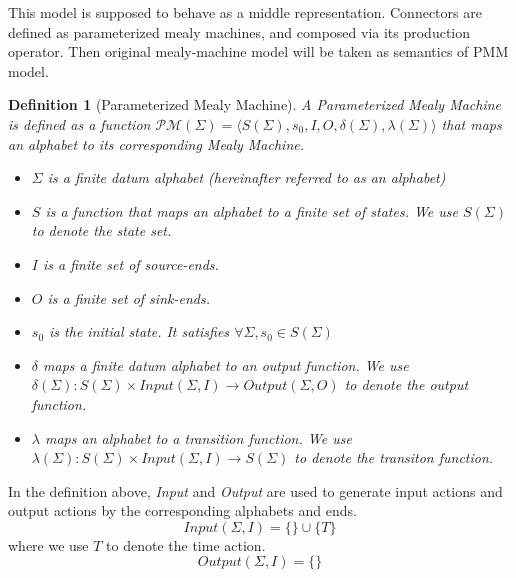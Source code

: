 \documentclass[conference, a4paper]{IEEEtran}
\newtheorem{definition}{Definition}
\begin{document}
This model is supposed to behave as a middle representation. Connectors are defined as parameterized
mealy machines, and composed via its production operator. Then original mealy-machine model will be
taken as semantics of PMM model.

\begin{definition}[Parameterized Mealy Machine]
  A \emph{Parameterized Mealy Machine} is defined as a function $\mathcal{PM}(\Sigma)=\langle
  S(\Sigma), s_0, I, O, \delta(\Sigma), \lambda(\Sigma)\rangle$ that maps an
  alphabet to its corresponding Mealy Machine. 
  \begin{itemize}
    \item[-] $\Sigma$ is a \emph{finite} datum alphabet (hereinafter referred to as an alphabet)
    \item[-] $S$ is a function that maps an alphabet to a \emph{finite} set of
      states. We use $S(\Sigma)$ to denote the state set.
    \item[-] $I$ is a finite set of source-ends.
    \item[-] $O$ is a finite set of sink-ends.
    \item[-] $s_0$ is the initial state. It satisfies $\forall \Sigma,s_0\in S(\Sigma)$
    \item[-] $\delta$ maps a \emph{finite} datum alphabet to an \emph{output function}. We use
      $\delta(\Sigma):S(\Sigma)\times Input(\Sigma,I)\rightarrow Output(\Sigma, O)$ to denote the output function.
    \item[-] $\lambda$ maps an alphabet to a \emph{transition function}. We use
      $\lambda(\Sigma):S(\Sigma)\times Input(\Sigma,I)\rightarrow S(\Sigma)$ to denote the transiton
      function.
  \end{itemize}
\end{definition}

In the definition above, \emph{Input} and \emph{Output} are used to generate input actions and output actions by the corresponding alphabets and ends.
\[
Input(\Sigma,I)=\{\}\cup\{T\}
\]
where we use $T$ to denote the time action.
\[
Output(\Sigma,I)=\{\}
\]
\end{document}
